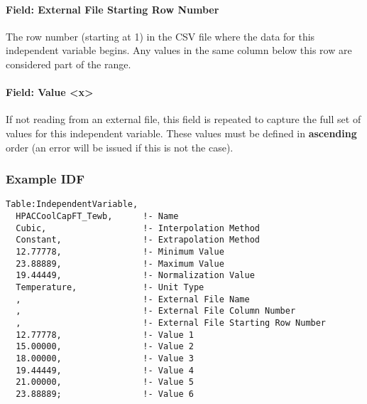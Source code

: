 \paragraph{Field: External File Starting Row
Number}\label{field-external-file-starting-row-number-1}

The row number (starting at 1) in the CSV file where the data for this
independent variable begins. Any values in the same column below this
row are considered part of the range.

\paragraph{Field: Value
\textless{}x\textgreater{}}\label{field-value-x}

If not reading from an external file, this field is repeated to capture
the full set of values for this independent variable. These values must
be defined in \textbf{ascending} order (an error will be issued if this
is not the case).

\subsubsection{Example IDF}\label{example-idf-2}

\begin{lstlisting}
Table:IndependentVariable,
  HPACCoolCapFT_Tewb,      !- Name
  Cubic,                   !- Interpolation Method
  Constant,                !- Extrapolation Method
  12.77778,                !- Minimum Value
  23.88889,                !- Maximum Value
  19.44449,                !- Normalization Value
  Temperature,             !- Unit Type
  ,                        !- External File Name
  ,                        !- External File Column Number
  ,                        !- External File Starting Row Number
  12.77778,                !- Value 1
  15.00000,                !- Value 2
  18.00000,                !- Value 3
  19.44449,                !- Value 4
  21.00000,                !- Value 5
  23.88889;                !- Value 6
\end{lstlisting}
